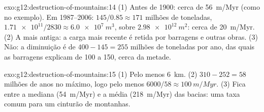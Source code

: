 \begin{solution}{exo:g12:destruction-of-mountains:14}
(1) Antes de 1900: cerca de \qty{56}{m/Myr} (como no exemplo). Em
1987--2006: $145/0.85 \approx 171$ milhões de toneladas, $\num{1.71e11}/2830
\approx \qty{6.0e7}{m^3}$, sobre $\qty{2.98e12}{m^2}$: cerca de
\qty{20}{m/Myr}. (2) A mais antiga: a carga mais recente é retida por
barragens e outras obras. (3) Não: a diminuição é de $400 - 145 = 255$
milhões de toneladas por ano, das quais as barragens explicam de 100 a 150,
cerca da metade.
\end{solution}

\begin{solution}{exo:g12:destruction-of-mountains:15}
(1) Pelo menos \qty{6}{km}. (2) $310 - 252 = 58$ milhões de anos no máximo,
logo pelo menos $6000/58 \approx \qty{100}{m/Myr}$. (3) Fica entre a mediana
(\qty{54}{m/Myr}) e a média (\qty{218}{m/Myr}) das bacias: uma taxa comum
para um cinturão de montanhas.
\end{solution}

